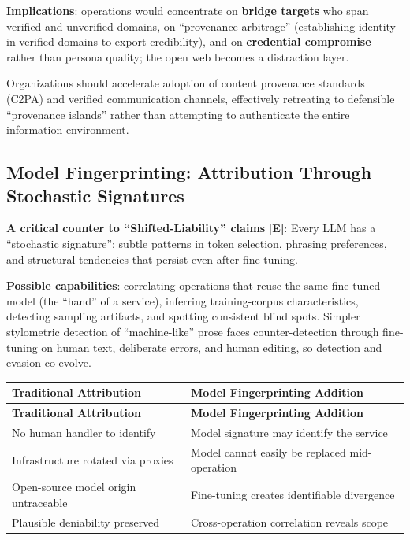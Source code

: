 \documentclass[11pt,letterpaper]{article}
\newcommand{\etraneed}[1]{\par\ifdim\pagegoal<\maxdimen\ifdim\pagetotal<\pagegoal\ifdim\dimexpr\pagegoal-\pagetotal\relax<\dimexpr#1\relax\newpage\fi\fi\fi}
\begin{document}
\textbf{Implications}: operations would concentrate on \textbf{bridge targets} who span verified and unverified domains, on ``provenance arbitrage'' (establishing identity in verified domains to export credibility), and on \textbf{credential compromise} rather than persona quality; the open web becomes a distraction layer.

\begin{recbox}
Organizations should accelerate adoption of content provenance standards (C2PA) and verified communication channels, effectively retreating to defensible ``provenance islands'' rather than attempting to authenticate the entire information environment.
\end{recbox}

\subsection{Model Fingerprinting: Attribution Through Stochastic Signatures}

\textbf{A critical counter to ``Shifted-Liability'' claims} \textbf{[E]}: Every LLM has a ``stochastic signature'': subtle patterns in token selection, phrasing preferences, and structural tendencies that persist even after fine-tuning.

\textbf{Possible capabilities}: correlating operations that reuse the same fine-tuned model (the ``hand'' of a service), inferring training-corpus characteristics, detecting sampling artifacts, and spotting consistent blind spots. Simpler stylometric detection of ``machine-like'' prose faces counter-detection through fine-tuning on human text, deliberate errors, and human editing, so detection and evasion co-evolve.

\etraneed{10\baselineskip}
{\small
\begin{longtable}{L{5cm}L{6.5cm}}
\toprule
\textbf{Traditional Attribution} & \textbf{Model Fingerprinting Addition} \\
\midrule
\endfirsthead
\toprule
\textbf{Traditional Attribution} & \textbf{Model Fingerprinting Addition} \\
\midrule
\endhead
No human handler to identify & Model signature may identify the service \\*
Infrastructure rotated via proxies & Model cannot easily be replaced mid-operation \\
Open-source model origin untraceable & Fine-tuning creates identifiable divergence \\*
Plausible deniability preserved & Cross-operation correlation reveals scope \\
\bottomrule
\end{longtable}}
\end{document}
